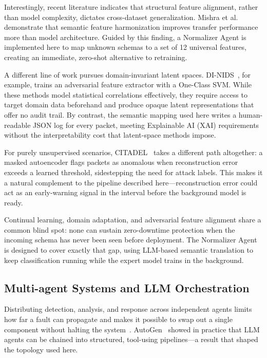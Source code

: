 \documentclass[conference]{IEEEtran}
\begin{document}
Interestingly, recent literature indicates that structural feature alignment, rather than model complexity, dictates cross-dataset generalization. Mishra et al.~\cite{mishra2026harmonization} demonstrate that semantic feature harmonization improves transfer performance more than model architecture. Guided by this finding, a Normalizer Agent is implemented here to map unknown schemas to a set of 12 universal features, creating an immediate, zero-shot alternative to retraining.

A different line of work pursues domain-invariant latent spaces. DI-NIDS~\cite{layeghy2023dinids}, for example, trains an adversarial feature extractor with a One-Class SVM. While these methods model statistical correlations effectively, they require access to target domain data beforehand and produce opaque latent representations that offer no audit trail. By contrast, the semantic mapping used here writes a human-readable JSON log for every packet, meeting Explainable AI (XAI) requirements without the interpretability cost that latent-space methods impose.

For purely unsupervised scenarios, CITADEL~\cite{li2025citadel} takes a different path altogether: a masked autoencoder flags packets as anomalous when reconstruction error exceeds a learned threshold, sidestepping the need for attack labels. This makes it a natural complement to the pipeline described here---reconstruction error could act as an early-warning signal in the interval before the background model is ready.

Continual learning, domain adaptation, and adversarial feature alignment share a common blind spot: none can sustain zero-downtime protection when the incoming schema has never been seen before deployment. The Normalizer Agent is designed to cover exactly that gap, using LLM-based semantic translation to keep classification running while the expert model trains in the background.

\subsection{Multi-agent Systems and LLM Orchestration}

Distributing detection, analysis, and response across independent agents limits how far a fault can propagate and makes it possible to swap out a single component without halting the system~\cite{wooldridge2009introduction}. AutoGen~\cite{wu2023autogen} showed in practice that LLM agents can be chained into structured, tool-using pipelines---a result that shaped the topology used here.
\end{document}
